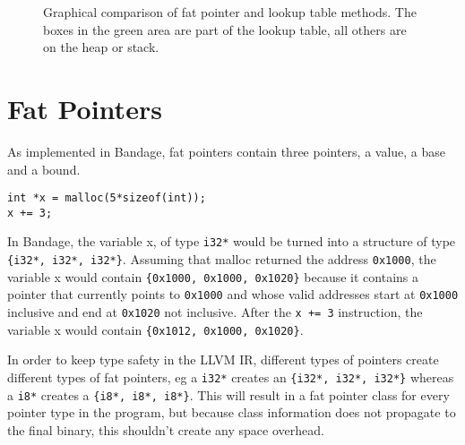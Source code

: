 \begin{figure}[h]
\caption{Graphical comparison of fat pointer and lookup table methods. The boxes in the green area are part of the lookup table, all others are on the heap or stack.}
\label{fig:FatPointerAndTable}
\end{figure}


\section{Fat Pointers}
As implemented in Bandage, fat pointers contain three pointers, a value, a base and a bound.

\begin{verbatim}
int *x = malloc(5*sizeof(int));
x += 3;
\end{verbatim}

In Bandage, the variable x, of type \verb!i32*! would be turned into a structure of type \verb!{i32*, i32*, i32*}!.
Assuming that malloc returned the address \verb!0x1000!, the variable x would contain \verb!{0x1000, 0x1000, 0x1020}! because it contains a pointer that currently points to \verb!0x1000! and whose valid addresses start at \verb!0x1000! inclusive and end at \verb!0x1020! not inclusive.
After the \verb!x += 3! instruction, the variable x would contain \verb!{0x1012, 0x1000, 0x1020}!.

In order to keep type safety in the LLVM IR, different types of pointers create different types of fat pointers, eg a \verb!i32*! creates an \verb!{i32*, i32*, i32*}! whereas a \verb!i8*! creates a \verb!{i8*, i8*, i8*}!.
This will result in a fat pointer class for every pointer type in the program, but because class information does not propagate to the final binary, this shouldn't create any space overhead.

